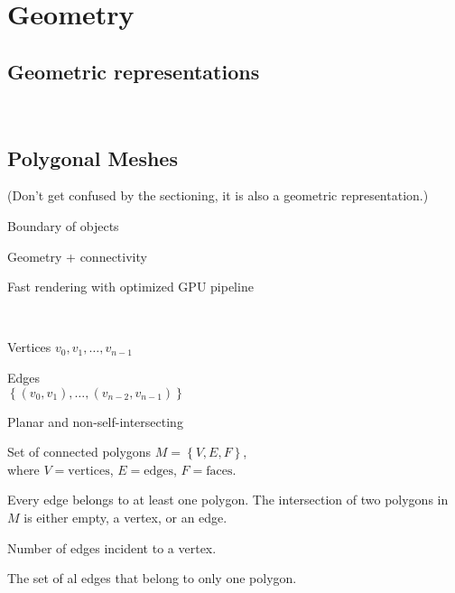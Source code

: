 \chapter{Geometry}
\section{Geometric representations}
\begin{compactdesc}
	\item[\lp{Parametric surfaces}]
	\item[\lp{Subdivision surface}]
	\item[\lp{Point set surface}]
	\item[\lp{Implicit surface}]\hfill\\
\section{Polygonal Meshes} (Don't get confused by the sectioning, it is also a geometric representation.)
	\begin{enumerate*}[label=\protect\circled{\arabic*},itemjoin=]
		\item Boundary of objects\\
		\item Geometry + connectivity\\
		\item Fast rendering with optimized GPU pipeline
	\end{enumerate*}
	\item[\lp{Polygon definition}]\hfill\\
		\begin{enumerate*}[label=\protect\circled{\arabic*},itemjoin=]
			\item Vertices $v_0,v_1,\ldots,v_{n-1}$\\
			\item Edges\hfill\\ $\left\{ (v_0,v_1),\ldots,(v_{n-2},v_{n-1}) \right\}$\\
			\item Planar and non-self-intersecting\\
			\item Set of connected polygons $M=\left\{ V,E,F \right\}$,\\
				where $V=\text{vertices}$, $E=\text{edges}$, $F=\text{faces}$.
		\end{enumerate*}
		Every edge belongs to at least one polygon. The intersection of two polygons in $M$ is either empty, a vertex, or an edge.
	\item[\lp{Vertex degree (valence)}] Number of edges incident to a vertex.
	\item[\lp{Boundary}] The set of al edges that belong to only one polygon.

\end{compactdesc}
